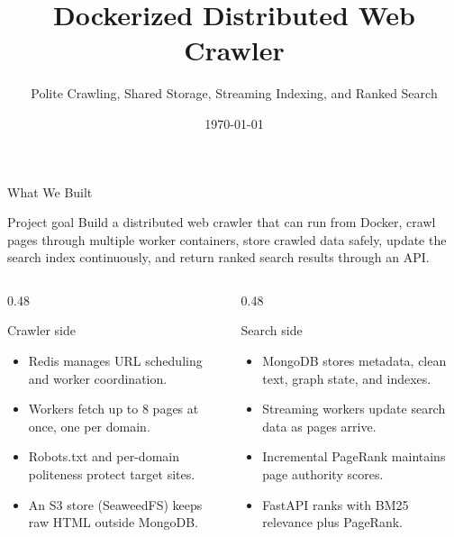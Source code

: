 \documentclass[aspectratio=169,11pt]{beamer}
\title[Distributed Web Crawler]{Dockerized Distributed Web Crawler}
\subtitle{Polite Crawling, Shared Storage, Streaming Indexing, and Ranked Search}
\institute{Project Evaluation Presentation}
\date{\today}
\begin{document}
\begin{frame}
  \titlepage
\end{frame}

\begin{frame}{What We Built}
  \small
  \begin{block}{Project goal}
    Build a distributed web crawler that can run from Docker, crawl pages through multiple worker containers, store crawled data safely, update the search index continuously, and return ranked search results through an API.
  \end{block}

  \begin{columns}[T,totalwidth=\textwidth]
    \begin{column}{0.48\textwidth}
      \begin{block}{Crawler side}
        \begin{itemize}
          \item Redis manages URL scheduling and worker coordination.
          \item Workers fetch up to 8 pages at once, one per domain.
          \item Robots.txt and per-domain politeness protect target sites.
          \item An S3 store (SeaweedFS) keeps raw HTML outside MongoDB.
        \end{itemize}
      \end{block}
    \end{column}
    \begin{column}{0.48\textwidth}
      \begin{block}{Search side}
        \begin{itemize}
          \item MongoDB stores metadata, clean text, graph state, and indexes.
          \item Streaming workers update search data as pages arrive.
          \item Incremental PageRank maintains page authority scores.
          \item FastAPI ranks with BM25 relevance plus PageRank.
        \end{itemize}
      \end{block}
    \end{column}
  \end{columns}
\end{frame}
\end{document}
